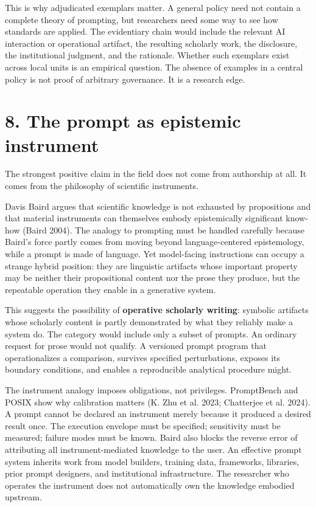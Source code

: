 \documentclass[
]{article}
\begin{document}
This is why adjudicated exemplars matter. A general policy need not
contain a complete theory of prompting, but researchers need some way to
see how standards are applied. The evidentiary chain would include the
relevant AI interaction or operational artifact, the resulting scholarly
work, the disclosure, the institutional judgment, and the rationale.
Whether such exemplars exist across local units is an empirical
question. The absence of examples in a central policy is not proof of
arbitrary governance. It is a research edge.

\section{8. The prompt as epistemic
instrument}\label{the-prompt-as-epistemic-instrument}

The strongest positive claim in the field does not come from authorship
at all. It comes from the philosophy of scientific instruments.

Davis Baird argues that scientific knowledge is not exhausted by
propositions and that material instruments can themselves embody
epistemically significant know-how (Baird 2004). The analogy to
prompting must be handled carefully because Baird's force partly comes
from moving beyond language-centered epistemology, while a prompt is
made of language. Yet model-facing instructions can occupy a strange
hybrid position: they are linguistic artifacts whose important property
may be neither their propositional content nor the prose they produce,
but the repeatable operation they enable in a generative system.

This suggests the possibility of \textbf{operative scholarly writing}:
symbolic artifacts whose scholarly content is partly demonstrated by
what they reliably make a system do. The category would include only a
subset of prompts. An ordinary request for prose would not qualify. A
versioned prompt program that operationalizes a comparison, survives
specified perturbations, exposes its boundary conditions, and enables a
reproducible analytical procedure might.

The instrument analogy imposes obligations, not privileges. PromptBench
and POSIX show why calibration matters (K. Zhu et al. 2023; Chatterjee
et al. 2024). A prompt cannot be declared an instrument merely because
it produced a desired result once. The execution envelope must be
specified; sensitivity must be measured; failure modes must be known.
Baird also blocks the reverse error of attributing all
instrument-mediated knowledge to the user. An effective prompt system
inherits work from model builders, training data, frameworks, libraries,
prior prompt designers, and institutional infrastructure. The researcher
who operates the instrument does not automatically own the knowledge
embodied upstream.
\end{document}
